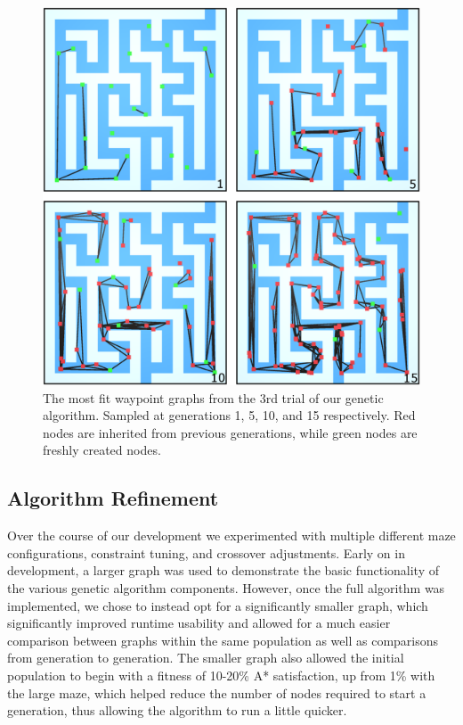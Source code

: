 	
	\begin{figure}
		\includegraphics[width=1\columnwidth]{tests/geneticT3b}
		\caption{The most fit waypoint graphs from the 3rd trial of our genetic algorithm. Sampled at generations 1, 5, 10, and 15 respectively. Red nodes are inherited from previous generations, while green nodes are freshly created nodes.}
	\end{figure}
	
	
	\subsection{Algorithm Refinement}
	Over the course of our development we experimented with multiple different maze configurations, constraint tuning, and crossover adjustments. Early on in development, a larger graph was used to demonstrate the basic functionality of the various genetic algorithm components. However, once the full algorithm was implemented, we chose to instead opt for a significantly smaller graph, which significantly improved runtime usability and allowed for a much easier comparison between graphs within the same population as well as comparisons from generation to generation. The smaller graph also allowed the initial population to begin with a fitness of 10-20\% A* satisfaction, up from 1\% with the large maze, which helped reduce the number of nodes required to start a generation, thus allowing the algorithm to run a little quicker.
	
